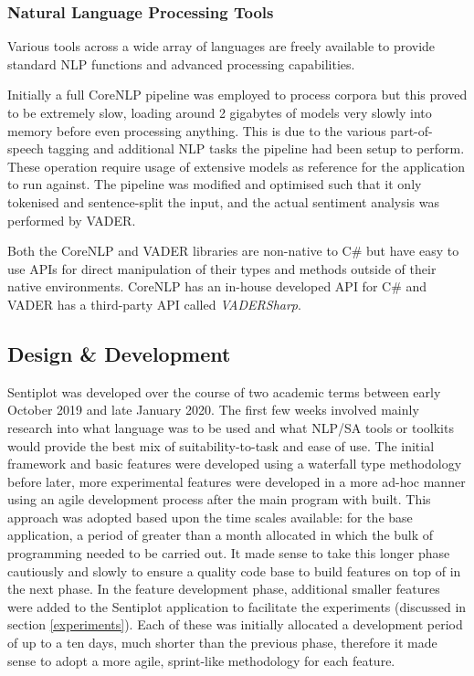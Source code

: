 \documentclass{article}
\begin{document}
{        \subsubsection{Natural Language Processing Tools}
        \label{subsec:nlpTools}
        Various tools across a wide array of languages are freely available to provide standard NLP functions and advanced processing capabilities.

        Initially a full CoreNLP pipeline was employed to process corpora but this proved to be extremely slow, loading around 2 gigabytes of models very slowly into memory before even processing anything. This is due to the various part-of-speech tagging and additional NLP tasks the pipeline had been setup to perform. These operation require usage of extensive models as reference for the application to run against. The pipeline was modified and optimised such that it only tokenised and sentence-split the input, and the actual sentiment analysis was performed by VADER.

        Both the CoreNLP and VADER libraries are non-native to C\# but have easy to use APIs for direct manipulation of their types and methods outside of their native environments. CoreNLP has an in-house developed API for C\# and VADER has a third-party API called \textit{VADERSharp}.
    \subsection{Design \& Development}
    \label{subsec:dnd}
        Sentiplot was developed over the course of two academic terms between early October 2019 and late January 2020. The first few weeks involved mainly research into what language was to be used and what NLP/SA tools or toolkits would provide the best mix of suitability-to-task and ease of use. The initial framework and basic features were developed using a waterfall type methodology before later, more experimental features were developed in a more ad-hoc manner using an agile development process after the main program with built. This approach was adopted based upon the time scales available: for the base application, a period of greater than a month allocated in which the bulk of programming needed to be carried out. It made sense to take this longer phase cautiously and slowly to ensure a quality code base to build features on top of in the next phase. In the feature development phase, additional smaller features were added to the Sentiplot application to facilitate the experiments (discussed in section \ref{experiments}). Each of these was initially allocated a development period of up to a ten days, much shorter than the previous phase, therefore it made sense to adopt a more agile, sprint-like methodology for each feature.
        
}
\end{document}
